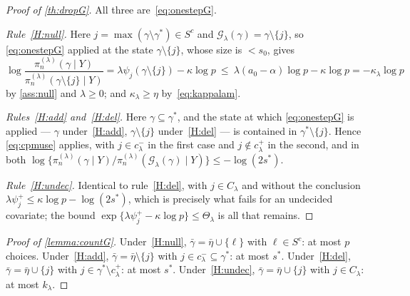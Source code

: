 \begin{proof}[Proof of \cref{th:dropG}]
    All three are~\eqref{eq:onestepG}.

    \emph{Rule~\ref{H:null}.} Here $j=\max(\gamma\setminus\gamma^{\ast})
    \in S^{c}$ and $\mathcal{G}_\lambda(\gamma)=\gamma\setminus\{j\}$, so
    \eqref{eq:onestepG} applied at the state $\gamma\setminus\{j\}$,
    whose size is $<s_0$, gives
    \begin{equation*}
        \log\frac{\pi_n^{(\lambda)}(\gamma\mid Y)}
        {\pi_n^{(\lambda)}(\gamma\setminus\{j\}\mid Y)}
        =\lambda\psi_j(\gamma\setminus\{j\})-\kappa\log p
        \ \leq\ \lambda(a_0-\alpha)\log p-\kappa\log p
        =-\kappa_\lambda\log p
    \end{equation*}
    by \cref{ass:null} and $\lambda\geq0$; and
    $\kappa_\lambda\geq\eta$ by~\eqref{eq:kappalam}.

    \emph{Rules~\ref{H:add} and~\ref{H:del}.} Here
    $\gamma\subseteq\gamma^{\ast}$, and the state at which
    \eqref{eq:onestepG} is applied --- $\gamma$ under~\ref{H:add},
    $\gamma\setminus\{j\}$ under~\ref{H:del} --- is contained in
    $\gamma^{\ast}\setminus\{j\}$. Hence \eqref{eq:cpmuse} applies, with
    $j\in c^{-}_\lambda$ in the first case and $j\notin c^{+}_\lambda$ in
    the second, and in both
    $\log\{\pi_n^{(\lambda)}(\gamma\mid Y)/
    \pi_n^{(\lambda)}(\mathcal{G}_\lambda(\gamma)\mid Y)\}
    \leq-\log(2s^{\ast})$.

    \emph{Rule~\ref{H:undec}.} Identical to rule~\ref{H:del}, with
    $j\in C_\lambda$ and without the conclusion
    $\lambda\psi_j^{+}\leq\kappa\log p-\log(2s^{\ast})$, which is
    precisely what fails for an undecided covariate; the bound
    $\exp\{\lambda\psi_j^{+}-\kappa\log p\}\leq\Theta_\lambda$ is all that
    remains.
\end{proof}

\begin{proof}[Proof of \cref{lemma:countG}]
    Under~\ref{H:null}, $\bar\gamma=\bar\eta\cup\{\ell\}$ with
    $\ell\in S^{c}$: at most $p$ choices. Under~\ref{H:add},
    $\bar\gamma=\bar\eta\setminus\{j\}$ with
    $j\in c^{-}_\lambda\subseteq\gamma^{\ast}$: at most $s^{\ast}$.
    Under~\ref{H:del}, $\bar\gamma=\bar\eta\cup\{j\}$ with
    $j\in\gamma^{\ast}\setminus c^{+}_\lambda$: at most $s^{\ast}$.
    Under~\ref{H:undec}, $\bar\gamma=\bar\eta\cup\{j\}$ with
    $j\in C_\lambda$: at most $k_\lambda$.
\end{proof}


